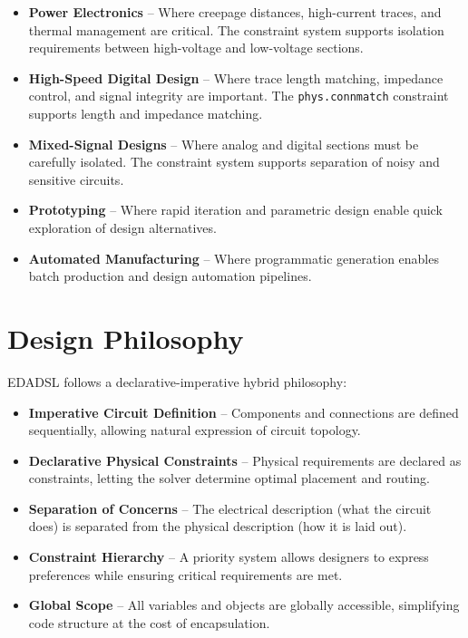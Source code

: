 \documentclass{report}
\begin{document}
\begin{itemize}
\item \textbf{Power Electronics} -- Where creepage distances, high-current traces, and thermal management are critical. The constraint system supports isolation requirements between high-voltage and low-voltage sections.

\item \textbf{High-Speed Digital Design} -- Where trace length matching, impedance control, and signal integrity are important. The \texttt{phys.connmatch} constraint supports length and impedance matching.

\item \textbf{Mixed-Signal Designs} -- Where analog and digital sections must be carefully isolated. The constraint system supports separation of noisy and sensitive circuits.

\item \textbf{Prototyping} -- Where rapid iteration and parametric design enable quick exploration of design alternatives.

\item \textbf{Automated Manufacturing} -- Where programmatic generation enables batch production and design automation pipelines.
\end{itemize}

\section{Design Philosophy}
EDADSL follows a declarative-imperative hybrid philosophy:

\begin{itemize}
\item \textbf{Imperative Circuit Definition} -- Components and connections are defined sequentially, allowing natural expression of circuit topology.

\item \textbf{Declarative Physical Constraints} -- Physical requirements are declared as constraints, letting the solver determine optimal placement and routing.

\item \textbf{Separation of Concerns} -- The electrical description (what the circuit does) is separated from the physical description (how it is laid out).

\item \textbf{Constraint Hierarchy} -- A priority system allows designers to express preferences while ensuring critical requirements are met.

\item \textbf{Global Scope} -- All variables and objects are globally accessible, simplifying code structure at the cost of encapsulation.
\end{itemize}
\end{document}
